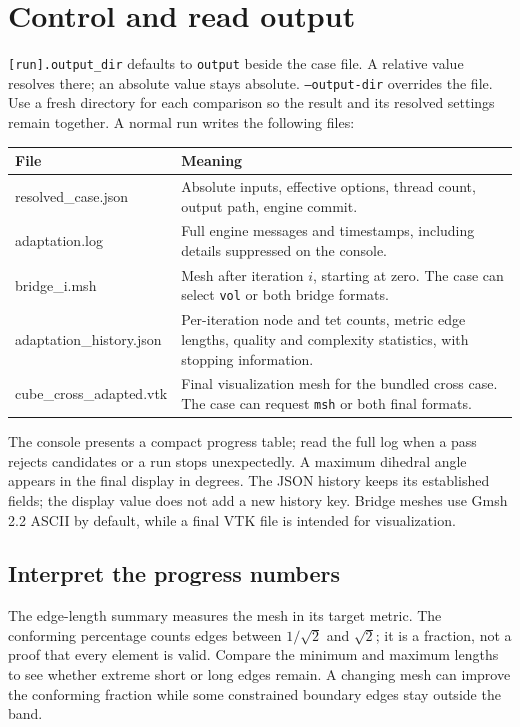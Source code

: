 \documentclass[11pt,a4paper]{article}
\begin{document}
\clearpage
\section{Control and read output}
\texttt{[run].output\_dir} defaults to \texttt{output} beside the case file. A relative value resolves there; an absolute value stays absolute. \texttt{--output-dir} overrides the file. Use a fresh directory for each comparison so the result and its resolved settings remain together. A normal run writes the following files:

\begin{longtable}{>{\ttfamily}p{.37\linewidth}p{.55\linewidth}}
\toprule
\normalfont File & Meaning\\
\midrule
\endhead
resolved\_case.json & Absolute inputs, effective options, thread count, output path, engine commit.\\
adaptation.log & Full engine messages and timestamps, including details suppressed on the console.\\
bridge\_i.msh & Mesh after iteration $i$, starting at zero. The case can select \texttt{vol} or both bridge formats.\\
adaptation\_history.json & Per-iteration node and tet counts, metric edge lengths, quality and complexity statistics, with stopping information.\\
cube\_cross\_adapted.vtk & Final visualization mesh for the bundled cross case. The case can request \texttt{msh} or both final formats.\\
\bottomrule
\end{longtable}

The console presents a compact progress table; read the full log when a pass rejects candidates or a run stops unexpectedly. A maximum dihedral angle appears in the final display in degrees. The JSON history keeps its established fields; the display value does not add a new history key. Bridge meshes use Gmsh 2.2 ASCII by default, while a final VTK file is intended for visualization.

\subsection{Interpret the progress numbers}
The edge-length summary measures the mesh in its target metric. The conforming percentage counts edges between $1/\sqrt2$ and $\sqrt2$; it is a fraction, not a proof that every element is valid. Compare the minimum and maximum lengths to see whether extreme short or long edges remain. A changing mesh can improve the conforming fraction while some constrained boundary edges stay outside the band.
\end{document}
